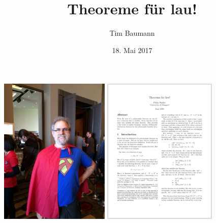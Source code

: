 \documentclass{beamer}
\title{Theoreme für lau!}
\author{Tim Baumann}
\institute[CCA]{Curry Club Augsburg}
\date{18. Mai 2017}
\begin{document}
\begin{frame}
  \titlepage
\end{frame}

\begin{frame}
  \begin{center}
    \includegraphics[height=7cm]{wadler-lambdaman.jpg} \quad
    \includegraphics[height=7cm]{theorems-for-free.png}
  \end{center}
\end{frame}
\end{document}
